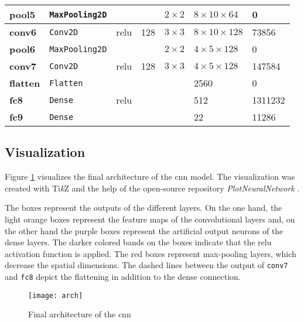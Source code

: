 \begin{table}
\begin{tabular}{lllllll}
    \textbf{pool5} & \texttt{MaxPooling2D} &  &  & $2\times 2$ & $8\times 10\times 64$ & \num{0} \\
    \midrule
    \textbf{conv6} & \texttt{Conv2D} & \acrshort{relu} & \num{128} & $3\times 3$ & $8\times 10\times 128$ & \num{73856} \\
    \textbf{pool6} & \texttt{MaxPooling2D} &  &  & $2\times 2$ & $4\times 5\times 128$ & \num{0} \\
    \midrule
    \textbf{conv7} & \texttt{Conv2D} & \acrshort{relu} & \num{128} & $3\times 3$ & $4\times 5\times 128$ & \num{147584} \\
    \midrule
    \textbf{flatten} & \texttt{Flatten} &  &  &  & \num{2560} & \num{0} \\
    \textbf{fc8} & \texttt{Dense} & \acrshort{relu} &  &  & \num{512} & \num{1311232} \\
    \textbf{fc9} & \texttt{Dense} &  &  &  & \num{22} & \num{11286} \\
    \bottomrule
  \end{tabular}
\end{table}

\subsection{Visualization}
\label{subsec:training_of_the_cnn:architecture:visualization}
Figure \ref{fig:arch} visualizes the final architecture of the \acrshort{cnn} model.
The visualization was created with Ti\textit{k}Z and the help of the open-source repository \textit{PlotNeuralNetwork} \cite{training_arch_plot}.

The boxes represent the outputs of the different layers.
On the one hand, the light orange boxes represent the feature maps of the convolutional layers and, on the other hand the purple boxes represent the artificial output neurons of the dense layers.
The darker colored bands on the boxes indicate that the \acrshort{relu} activation function is applied.
The red boxes represent max-pooling layers, which decrease the spatial dimensions.
The dashed lines between the output of \texttt{conv7} and \texttt{fc8} depict the flattening in addition to the dense connection.

\begin{figure}
  \centering
  \texttt{[image: arch]}
  \caption{Final architecture of the \acrlong{cnn}}
  \label{fig:arch}
\end{figure}


